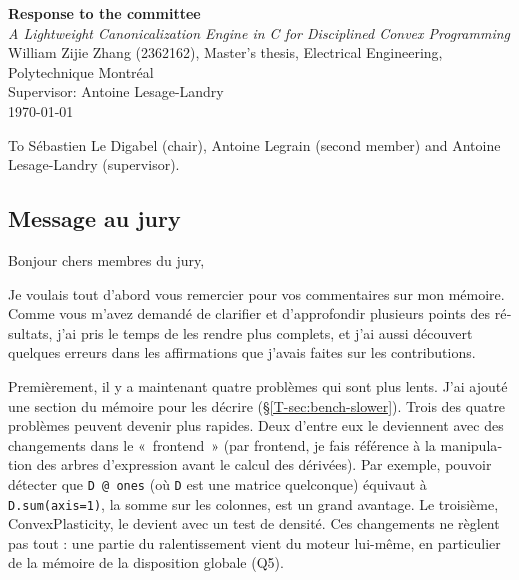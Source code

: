 \documentclass[letterpaper,12pt]{article}
\newcommand{\tsec}[1]{\S\ref{T-#1}}
\begin{document}
\begin{center}
{\Large\bfseries Response to the committee}\\[0.5em]
\emph{A Lightweight Canonicalization Engine in C for Disciplined Convex Programming}\\[0.3em]
William Zijie Zhang (2362162), Master's thesis, Electrical Engineering, Polytechnique
Montréal\\
Supervisor: Antoine Lesage-Landry\\[0.3em]
\today
\end{center}

\noindent To Sébastien Le Digabel (chair), Antoine Legrain (second member) and Antoine
Lesage-Landry (supervisor).

\begin{otherlanguage}{french}
\section*{Message au jury}

Bonjour chers membres du jury,

Je voulais tout d'abord vous remercier pour vos commentaires sur mon mémoire. Comme vous m'avez
demandé de clarifier et d'approfondir plusieurs points des résultats, j'ai pris le temps de les
rendre plus complets, et j'ai aussi découvert quelques erreurs dans les affirmations que j'avais
faites sur les contributions.

Premièrement, il y a maintenant quatre problèmes qui sont plus lents. J'ai ajouté une section du
mémoire pour les décrire (\tsec{sec:bench-slower}). Trois des quatre problèmes peuvent devenir
plus rapides. Deux d'entre eux le deviennent avec des changements dans le «~frontend~» (par
frontend, je fais référence à la manipulation des arbres d'expression avant le calcul des
dérivées). Par exemple, pouvoir détecter que \texttt{D @ ones} (où \texttt{D} est une matrice
quelconque) équivaut à \texttt{D.sum(axis=1)}, la somme sur les colonnes, est un grand avantage.
Le troisième, ConvexPlasticity, le devient avec un test de densité. Ces changements ne règlent
pas tout : une partie du ralentissement vient du moteur lui-même, en particulier de la mémoire
de la disposition globale (Q5).


\end{otherlanguage}
\end{document}
